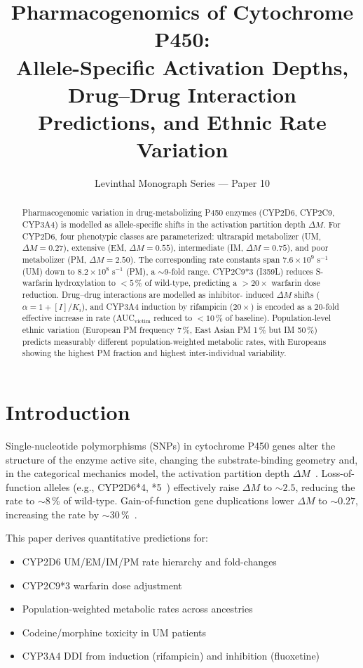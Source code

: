 \documentclass[11pt,twocolumn,a4paper]{article}
\title{\textbf{Pharmacogenomics of Cytochrome P450:\\
Allele-Specific Activation Depths, Drug--Drug Interaction\\
Predictions, and Ethnic Rate Variation}}
\author{Levinthal Monograph Series --- Paper 10}
\date{}
\begin{document}
\maketitle

\begin{abstract}
Pharmacogenomic variation in drug-metabolizing P450 enzymes (CYP2D6, CYP2C9,
CYP3A4) is modelled as allele-specific shifts in the activation partition depth
$\Delta M$.  For CYP2D6, four phenotypic classes are parameterized: ultrarapid
metabolizer (UM, $\Delta M=0.27$), extensive (EM, $\Delta M=0.55$), intermediate
(IM, $\Delta M=0.75$), and poor metabolizer (PM, $\Delta M=2.50$).  The
corresponding rate constants span $7.6\times10^9$ s$^{-1}$ (UM) down to
$8.2\times10^8$ s$^{-1}$ (PM), a $\sim$9-fold range.  CYP2C9*3 (I359L) reduces
S-warfarin hydroxylation to $<5$\,\% of wild-type, predicting a $>20\times$
warfarin dose reduction.  Drug--drug interactions are modelled as inhibitor-
induced $\Delta M$ shifts ($\alpha = 1 + [I]/K_i$), and CYP3A4 induction by
rifampicin ($20\times$) is encoded as a 20-fold effective increase in rate
(AUC$_\text{victim}$ reduced to $<10$\,\% of baseline).  Population-level
ethnic variation (European PM frequency 7\,\%, East Asian PM 1\,\% but IM 50\,\%)
predicts measurably different population-weighted metabolic rates, with
Europeans showing the highest PM fraction and highest inter-individual variability.
\end{abstract}

\tableofcontents
\newpage

\section{Introduction}

Single-nucleotide polymorphisms (SNPs) in cytochrome P450 genes alter the
structure of the enzyme active site, changing the substrate-binding geometry
and, in the categorical mechanics model, the activation partition depth $\Delta M$~\citep{Ingelman-Sundberg2004}.
Loss-of-function alleles (e.g., CYP2D6*4, *5~\citep{Cascorbi2003,PharmVar2020}) effectively raise $\Delta M$
to $\sim 2.5$, reducing the rate to $\sim 8$\,\% of wild-type.  Gain-of-function
gene duplications lower $\Delta M$ to $\sim 0.27$, increasing the rate by
$\sim 30$\,\%~\citep{Cascorbi2003}.

This paper derives quantitative predictions for:
\begin{itemize}
  \item CYP2D6 UM/EM/IM/PM rate hierarchy and fold-changes
  \item CYP2C9*3 warfarin dose adjustment
  \item Population-weighted metabolic rates across ancestries
  \item Codeine/morphine toxicity in UM patients
  \item CYP3A4 DDI from induction (rifampicin) and inhibition (fluoxetine)
\end{itemize}
\end{document}
